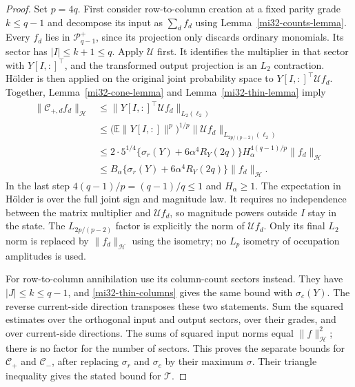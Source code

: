 \documentclass[11pt]{article}
\theoremstyle{definition}
\theoremstyle{remark}
\newcommand{\E}{\mathbb E}
\newcommand{\norm}[1]{\lVert#1\rVert}
\begin{document}
\begin{proof}
Set $p=4q$. First consider row-to-column creation at a fixed parity
grade $k\le q-1$ and decompose its input as $\sum_df_d$ using
Lemma~\ref{mi32-counts-lemma}. Every $f_d$ lies in
$\mathcal P_{q-1}^+$, since its projection only discards ordinary
monomials. Its sector has $|I|\le k+1\le q$.
Apply $\mathcal U$ first. It identifies the multiplier in that sector
with $Y[I,:]^\top$, and the transformed output projection is an
$L_2$ contraction. H\"older is then applied on the original joint
probability space to $Y[I,:]^\top\mathcal U f_d$. Together,
Lemma~\ref{mi32-cone-lemma} and
Lemma~\ref{mi32-thin-lemma} imply
\begin{align}
 \norm{\mathcal C_{+,d}f_d}_{\mathcal H}
 &\le\norm{Y[I,:]^\top\mathcal U f_d}_{L_2(\ell_2)}\nonumber\\
 &\le\bigl(\E\norm{Y[I,:]}^p\bigr)^{1/p}
            \norm{\mathcal U f_d}_{L_{2p/(p-2)}(\ell_2)}\nonumber\\
 &\le2\cdot5^{1/4}\bigl\{\sigma_r(Y)+6\alpha^4R_Y(2q)\bigr\}
      H_\alpha^{4(q-1)/p}\norm{f_d}_{\mathcal H}\nonumber\\
 &\le B_\alpha\bigl\{\sigma_r(Y)+6\alpha^4R_Y(2q)\bigr\}
            \norm{f_d}_{\mathcal H}.
 \label{mi32-sector-bound}
\end{align}
In the last step $4(q-1)/p=(q-1)/q\le1$ and $H_\alpha\ge1$.
The expectation in H\"older is over the full joint sign and magnitude
law. It requires no independence between the matrix multiplier and
$\mathcal U f_d$, so magnitude powers outside $I$ stay in the state.
The $L_{2p/(p-2)}$ factor is explicitly the norm of $\mathcal U f_d$.
Only its final $L_2$ norm is replaced by $\norm{f_d}_{\mathcal H}$
using the isometry; no $L_p$ isometry of occupation amplitudes is used.

For row-to-column annihilation use its column-count sectors instead.
They have $|J|\le k\le q-1$, and \eqref{mi32-thin-columns} gives the
same bound with $\sigma_c(Y)$. The reverse current-side direction
transposes these two statements. Sum the squared estimates over the
orthogonal input and output sectors, over their grades, and over
current-side directions. The sums of squared input norms equal
$\norm{f}_{\mathcal H}^2$; there is no factor for the number of
sectors. This proves the separate bounds for $\mathcal C_+$ and
$\mathcal C_-$, after replacing $\sigma_r$ and $\sigma_c$ by their
maximum $\sigma$. Their triangle inequality gives the stated bound for
$\mathcal T$.
\end{proof}
\end{document}
